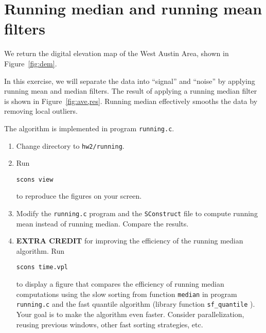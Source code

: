 \lstset{language=python,numbers=left,numberstyle=\tiny,showstringspaces=false}


\section{Running median and running mean filters}


We return the digital elevation map of the West Austin Area, shown in Figure~\ref{fig:dem}.

In this exercise, we will separate the data into ``signal'' and
``noise'' by applying running mean and median filters.  The result of
applying a running median filter is shown in
Figure~\ref{fig:ave,res}. Running median effectively smooths the data
by removing local outliers.


The algorithm is implemented in program \texttt{running.c}.

\lstset{language=c,numbers=left,numberstyle=\tiny,showstringspaces=false}


\begin{enumerate}
\item Change directory to \texttt{hw2/running}.
\item Run 
\begin{verbatim}
scons view
\end{verbatim}
to reproduce the figures on your screen.
\item Modify the \texttt{running.c} program and the
  \texttt{SConstruct} file to compute running mean instead of running
  median. Compare the results.
\item \textbf{EXTRA CREDIT} for improving the efficiency of the
  running median algorithm. Run
\begin{verbatim}
scons time.vpl
\end{verbatim}
  to display a figure that compares the efficiency of running median
  computations using the slow sorting from function \texttt{median} in
  program \texttt{running.c} and the fast quantile algorithm (library
  function \texttt{sf\_quantile} ). Your goal is to make the algorithm
  even faster. Consider parallelization, reusing previous windows,
  other fast sorting strategies, etc.
\end{enumerate}

